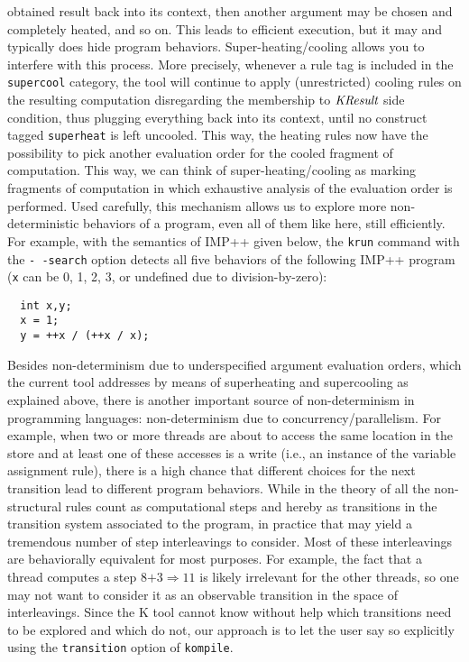 \documentclass{article}
\begin{document}
\begin{kdefinition}
\begin{kblock}[text]
obtained result back into its context, then another argument may be
chosen and completely heated, and so on.  This leads to efficient
execution, but it may and typically does hide program behaviors.
Super-heating/cooling allows you to interfere with this process.
More precisely, whenever a rule tag is included in the \texttt{supercool}
category, the \K tool will continue to apply (unrestricted) cooling rules
on the resulting computation disregarding the membership to $\textit{KResult}$
side condition, thus plugging everything back into its context, until no
construct tagged \texttt{superheat} is left uncooled.  This way, the
heating rules now have the possibility to pick another evaluation order
for the cooled fragment of computation.  This way, we can think of
super-heating/cooling as marking fragments of computation in which
exhaustive analysis of the evaluation order is performed.  Used carefully,
this mechanism allows us to explore more non-deterministic behaviors of a
program, even all of them like here, still efficiently.  For example, with
the semantics of IMP++ given below, the \texttt{krun} command with the
\texttt{-\,\!-search} option detects all five behaviors of the
following IMP++ program (\texttt{x} can be 0, 1, 2, 3, or undefined
due to division-by-zero):
\begin{verbatim}
  int x,y;
  x = 1;
  y = ++x / (++x / x);
\end{verbatim}

Besides non-determinism due to underspecified argument evaluation
orders, which the current \K tool addresses by means of superheating
and supercooling as explained above, there is another important source
of non-determinism in programming languages: non-determinism due to
concurrency/parallelism.  For example, when two or more threads are
about to access the same location in the store and at least one of
these accesses is a write (i.e., an instance of the variable
assignment rule), there is a high chance that different choices for
the next transition lead to different program behaviors.  While in the
theory of \K all the non-structural rules count as computational steps
and hereby as transitions in the transition system associated to the
program, in practice that may yield a tremendous number of step
interleavings to consider.  Most of these interleavings are behaviorally
equivalent for most purposes.  For example, the fact that a thread computes
a step $8\texttt{+}3 \Rightarrow 11$ is likely irrelevant for the other
threads, so one may not want to consider it as an observable transition in
the space of interleavings.  Since the K tool cannot know without help which
transitions need to be explored and which do not, our approach is to
let the user say so explicitly using the \texttt{transition} option of
\texttt{kompile}. \end{kblock}
\end{kdefinition}
\end{document}

